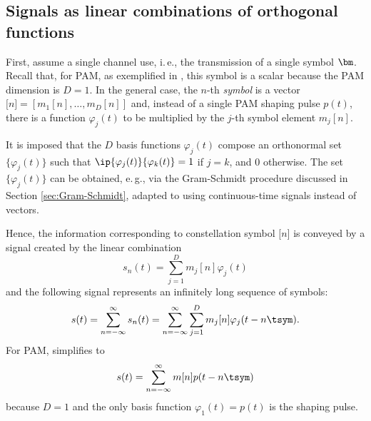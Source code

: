 \subsection{Signals as linear combinations of orthogonal functions}

First, assume a single channel use, i.\,e., the transmission of a single symbol $\bm$. Recall that, for PAM, as exemplified in , this symbol is a scalar because the PAM dimension is $D=1$. In the general case, the $n$-th \emph{symbol} is a vector $\bm[n]=[m_1[n], \ldots, m_D[n]]$ and, instead of a single PAM shaping pulse $p(t)$, there is a function $\varphi_j(t)$ to be multiplied by the $j$-th symbol element $m_j[n]$. 

It is imposed that the $D$ basis functions $\varphi_j(t)$ 
compose an orthonormal set $\{\varphi_j(t)\}$ such that $\ip{\varphi_j(t)}{\varphi_k(t)} = 1$ if $j=k$, and 0 otherwise.
The set $\{\varphi_j(t)\}$ can be obtained, e.\,g., via the Gram-Schmidt procedure discussed in Section \ref{sec:Gram-Schmidt}, adapted to using continuous-time signals instead of vectors.

Hence, the information corresponding to constellation symbol $\bm[n]$ is conveyed by a signal created by the linear combination
\begin{equation}
s_n(t) = \sum_{j=1}^D m_j[n] \varphi_j(t)
\label{eq:signalComposedByLinearCombination}
\end{equation}
and the following signal represents an infinitely long sequence of symbols:
\begin{equation}
s(t) = \sum_{n=-\infty}^{\infty} s_n(t) = \sum_{n=-\infty}^{\infty} \sum_{j=1}^D m_j[n] \varphi_j(t - n \tsym).
\label{eq:totalSignalComposedByLinearCombination}
\end{equation}
For PAM,  simplifies to
\begin{equation}
s(t) = \sum_{n=-\infty}^{\infty} m[n] p(t-n \tsym)
\label{eq:pamEquation2}
\end{equation}
because $D=1$ and the only basis function $\varphi_1(t)=p(t)$ is the shaping pulse.


